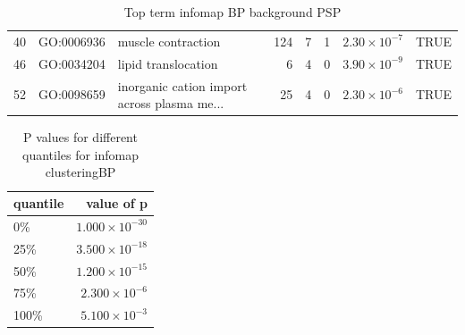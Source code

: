 \begin{table}[ht]
\begin{adjustbox}{max width=\textwidth}
\begin{tabular}{lllrrrrl}
  40 & GO:0006936 & muscle contraction & 124 & 7 & 1 & $2.30 \times 10^{-7}$ & TRUE \\ 
  46 & GO:0034204 & lipid translocation & 6 & 4 & 0 & $3.90 \times 10^{-9}$ & TRUE \\ 
  52 & GO:0098659 & inorganic cation import across plasma me... & 25 & 4 & 0 & $2.30 \times 10^{-6}$ & TRUE \\ 
   \hline
\end{tabular}
\end{adjustbox}
\caption{Top term  infomap BP background PSP} 
\label{tab:Top term  infomap BP background PSP}
\end{table}


\begin{table}[ht]
\centering

\begin{tabular}{lr}
  \hline
quantile & value of p \\ 
  \hline
0\% & $1.000 \times 10^{-30}$ \\ 
  25\% & $3.500 \times 10^{-18}$ \\ 
  50\% & $1.200 \times 10^{-15}$ \\ 
  75\% & $2.300 \times 10^{-6}$ \\ 
  100\% & $5.100 \times 10^{-3}$ \\ 
   \hline
\end{tabular}
\caption{P values for different quantiles for infomap clusteringBP} 
\label{tabP values for different quantiles for infomap clusteringBP}
\end{table}

